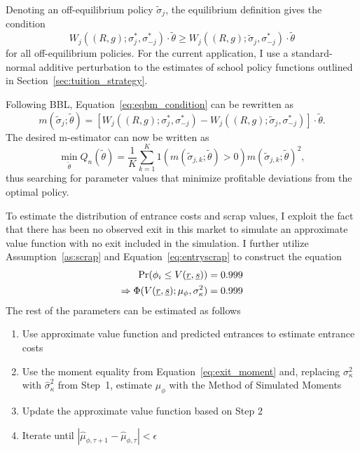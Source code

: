 \documentclass[12pt]{article}
\theoremstyle{definition}
\begin{document}
Denoting an off-equilibrium policy $\tilde{\sigma}_j$, the equilibrium definition gives the condition
\begin{equation}
  W_j((R, g); \sigma_j^*, \sigma_{-j}^*)\cdot\tilde{\theta} \geq
  W_j((R, g); \tilde{\sigma}_j, \sigma_{-j}^*)\cdot\tilde{\theta}
  \label{eq:eqbm_condition}
\end{equation}
for all off-equilibrium policies. For the current application, I use a standard-normal additive perturbation to the estimates of school policy functions outlined in Section~\ref{sec:tuition_strategy}.

Following BBL, Equation~\eqref{eq:eqbm_condition} can be rewritten as
\begin{equation}
  m(\tilde{\sigma}_j; \tilde{\theta}) = [
    W_j((R, g); \sigma_j^*, \sigma_{-j}^*) -
    W_j((R, g); \tilde{\sigma}_j, \sigma_{-j}^*)
  ]\cdot\tilde{\theta}.
\end{equation}
The desired m-estimator can now be written as
\begin{equation}
  \min_{\tilde{\theta}}Q_n(\tilde{\theta}) = \frac{1}{K}\sum_{k=1}^K
    1(m(\tilde{\sigma}_{j, k}; \tilde{\theta}) > 0)
    m(\tilde{\sigma}_{j, k}; \tilde{\theta})^2,
\end{equation}
thus searching for parameter values that minimize profitable deviations from the optimal policy.

To estimate the distribution of entrance costs and scrap values, I exploit the fact that there has been no observed exit in this market to simulate an approximate value function with no exit included in the simulation. I further utilize Assumption~\ref{as:scrap} and Equation~\eqref{eq:entryscrap} to construct the equation
\begin{align}
  \Pr(\phi_i \leq V(\underline{r}, \underline{s})) &= 0.999 \notag \\
  \Rightarrow \Phi(V(\underline{r}, \underline{s}); \mu_\phi, \sigma^2_\kappa) &= 0.999 \label{eq:exit_moment}
\end{align}
The rest of the parameters can be estimated as follows
\begin{enumerate}
  \item Use approximate value function and predicted entrances to estimate entrance costs
  \item Use the moment equality from Equation~\eqref{eq:exit_moment} and, replacing $\sigma^2_\kappa$ with $\hat{\sigma}^2_\kappa$ from Step~1, estimate $\mu_\phi$ with the Method of Simulated Moments
  \item Update the approximate value function based on Step 2
  \item Iterate until $|\hat{\mu}_{\phi, \tau+1} - \hat{\mu}_{\phi, \tau}| < \epsilon$
\end{enumerate}
\end{document}
